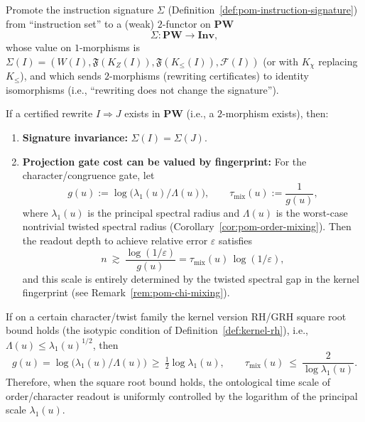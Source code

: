 \begin{definition}\label{def:pom-sigma-functor}
Promote the instruction signature $\Sigma$ (Definition~\ref{def:pom-instruction-signature}) from ``instruction set'' to a (weak) $2$-functor on $\mathbf{PW}$
\[
\Sigma:\mathbf{PW}\to \mathbf{Inv},
\]
whose value on $1$-morphisms is
\(
\Sigma(I)=(W(I),\mathfrak F(K_Z(I)),\mathfrak F(K_{\le}(I)),\mathcal F(I))
\)
(or with $K_\chi$ replacing $K_{\le}$), and which sends $2$-morphisms (rewriting certificates) to identity isomorphisms (i.e., ``rewriting does not change the signature'').
\end{definition}

\begin{proposition}\label{prop:pom-rewrite-audit-loop}
If a certified rewrite $I\Rightarrow J$ exists in $\mathbf{PW}$ (i.e., a $2$-morphism exists), then:
\begin{enumerate}
  \item \textbf{Signature invariance:} $\Sigma(I)=\Sigma(J)$.
  \item \textbf{Projection gate cost can be valued by fingerprint:} For the character/congruence gate, let
  \[
  g(u):=\log\!\bigl(\lambda_1(u)/\Lambda(u)\bigr),
  \qquad
  \tau_{\mathrm{mix}}(u):=\frac{1}{g(u)},
  \]
  where $\lambda_1(u)$ is the principal spectral radius and $\Lambda(u)$ is the worst-case nontrivial twisted spectral radius (Corollary~\ref{cor:pom-order-mixing}).
  Then the readout depth to achieve relative error $\varepsilon$ satisfies
  \[
  n\ \gtrsim\ \frac{\log(1/\varepsilon)}{g(u)}=\tau_{\mathrm{mix}}(u)\,\log(1/\varepsilon),
  \]
  and this scale is entirely determined by the twisted spectral gap in the kernel fingerprint (see Remark~\ref{rem:pom-chi-mixing}).
\end{enumerate}
\end{proposition}

\begin{corollary}[GRH-Type Square Root Bound \texorpdfstring{$\Rightarrow$}{=>} Universal Upper Bound on Mixing Scale]\label{cor:pom-grh-mix-upper}
If on a certain character/twist family the kernel version RH/GRH square root bound holds (the isotypic condition of Definition~\ref{def:kernel-rh}), i.e.,
\(
\Lambda(u)\le \lambda_1(u)^{1/2}
\),
then
\[
g(u)=\log\!\bigl(\lambda_1(u)/\Lambda(u)\bigr)\ \ge\ \tfrac12\log\lambda_1(u),
\qquad
\tau_{\mathrm{mix}}(u)\ \le\ \frac{2}{\log\lambda_1(u)}.
\]
Therefore, when the square root bound holds, the ontological time scale of order/character readout is uniformly controlled by the logarithm of the principal scale $\lambda_1(u)$.
\end{corollary}

